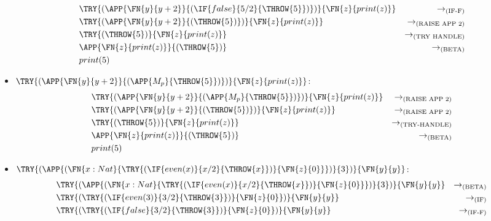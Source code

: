 \begin{itemize}
\begin{align*}
		       & \TRY{(\APP{\FN{y}{y+2}}{(\IF{false}{5/2}{\THROW{5}})})}{\FN{z}{print(z)}}
		       & \to_{\text{(IF-F)}}                                                         \\
		       & \TRY{(\APP{\FN{y}{y+2}}{(\THROW{5})})}{\FN{z}{print(z)}}
		       & \to_{\text{(RAISE APP 2)}}                                                  \\
		       & \TRY{(\THROW{5})}{\FN{z}{print(z)}}
		       & \to_{\text{(TRY HANDLE)}}                                                   \\
		       & \APP{\FN{z}{print(z)}}{(\THROW{5})}
		       & \to_{\text{(BETA)}}                                                         \\
		       & print(5)
	      \end{align*}
	\item $\TRY{(\APP{\FN{y}{y+2}}{(\APP{M_p}{\THROW{5}})})}{\FN{z}{print(z)}}$:
	      \begin{align*}
		       & \TRY{(\APP{\FN{y}{y+2}}{(\APP{M_p}{\THROW{5}})})}{\FN{z}{print(z)}}
		       & \to_{\text{(RAISE APP 2)}}                                          \\
		       & \TRY{(\APP{\FN{y}{y+2}}{(\THROW{5})})}{\FN{z}{print(z)}}
		       & \to_{\text{(RAISE APP 2)}}                                          \\
		       & \TRY{(\THROW{5})}{\FN{z}{print(z)}}
		       & \to_{\text{(TRY-HANDLE)}}                                           \\
		       & \APP{\FN{z}{print(z)}}{(\THROW{5})}
		       & \to_{\text{(BETA)}}                                                 \\
		       & print(5)
	      \end{align*}
	\item $\TRY{(\APP{(\FN{x:Nat}{\TRY{(\IF{even(x)}{x/2}{\THROW{x}})}{\FN{z}{0}}})}{3})}{\FN{y}{y}}$:
	      \begin{align*}
		       & \TRY{(\APP{(\FN{x:Nat}{\TRY{(\IF{even(x)}{x/2}{\THROW{x}})}{\FN{z}{0}}})}{3})}{\FN{y}{y}}
		       & \to_{\text{(BETA)}}                                                                       \\
		       & \TRY{(\TRY{(\IF{even(3)}{3/2}{\THROW{3}})}{\FN{z}{0}})}{\FN{y}{y}}
		       & \to_{\text{(IF)}}                                                                         \\
		       & \TRY{(\TRY{(\IF{false}{3/2}{\THROW{3}})}{\FN{z}{0}})}{\FN{y}{y}}
		       & \to_{\text{(IF-F)}}                                                                       \\

\end{align*}
\end{itemize}
